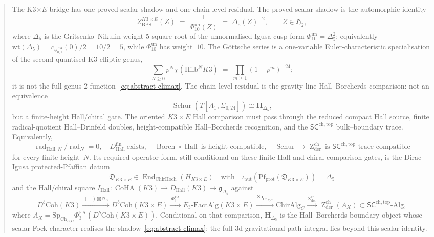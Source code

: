 \documentclass[11pt]{memoir}
\providecommand{\PhiFA}{\Phi^{\mathrm{FA}}}
\providecommand{\SpCh}{\mathrm{Sp}_{\mathrm{Ch}}}
\providecommand{\CoHA}{\operatorname{CoHA}}
\newcommand{\SCchtop}{{\mathsf{SC}^{\mathrm{ch,top}}}}
\providecommand{\Zderch}{\operatorname{Z}^{\mathrm{ch}}_{\mathrm{der}}}
\providecommand{\PhiFA}{\Phi^{\mathrm{FA}}}
\providecommand{\SpCh}{\mathrm{Sp}^{\mathrm{ch}}}
\providecommand{\protectedPfaff}[1]{\mathrm{Pf}_{\mathrm{prot}}(#1)}
\begin{document}
\begin{abstract}
The K3$\times E$ bridge has one proved scalar shadow and one
chain-level residual. The proved scalar shadow is the automorphic
identity
\begin{equation}
 Z^{K3\times E}_{\mathrm{BPS}}(Z)
 \;=\;
 \frac{1}{\Phi_{10}^{\mathrm{un}}(Z)}
 \;=\;
 \Delta_5(Z)^{-2},
 \qquad Z\in\mathfrak H_2,
\label{eq:abstract-climax}
\end{equation}
where $\Delta_5$ is the Gritsenko--Nikulin weight-$5$ square root
of the unnormalised Igusa cusp form
$\Phi_{10}^{\mathrm{un}}=\Delta_5^2$; equivalently
$\mathrm{wt}(\Delta_5)=c_{\phi_{0,1}^{K3}}(0)/2=10/2=5$, while
$\Phi_{10}^{\mathrm{un}}$ has weight~$10$. The G\"ottsche series is a one-variable
Euler-characteristic specialisation of the second-quantised K3
elliptic genus,
\[
 \sum_{N\ge 0}p^N\chi(\mathrm{Hilb}^N K3)
 \;=\;
 \prod_{m\ge 1}(1-p^m)^{-24};
\]
it is not the full genus-$2$ function~\eqref{eq:abstract-climax}.
The chain-level residual is the gravity-line Hall--Borcherds
comparison: not an equivalence
\[
\operatorname{Schur}\!\left(T[A_1,\Sigma_{0,24}]\right)
\cong \mathbf H_{\Delta_5},
\]
but a finite-height Hall/chiral gate.  The oriented $K3\times E$
Hall comparison must pass through the reduced compact Hall source,
finite radical-quotient Hall--Drinfeld doubles, height-compatible
Hall--Borcherds recognition, and the $\SCchtop$ bulk--boundary trace.
Equivalently,
\[
\operatorname{rad}_{\mathrm{Hall},N}/\operatorname{rad}_{N}=0,\quad
D^{\mathrm{fin}}_{\mathrm{Hall}}\ \text{exists},\quad
\operatorname{Borch}\circ\operatorname{Hall}\ \text{is height-compatible},
\quad
\operatorname{Schur}\to\Zderch\ \text{is }\SCchtop\text{-trace compatible}
\]
for every finite height~$N$. Its required operator form, still
conditional on these finite Hall and chiral-comparison gates, is the
Dirac--Igusa protected-Pfaffian datum
\[
 \mathfrak D_{K3\times E}\in
 \operatorname{End}_{\mathrm{ChirHoch}}\!\left(H_{K3\times E}\right)
 \quad\text{with}\quad
 \iota_{\mathrm{aut}}\!\left(\protectedPfaff{\mathfrak D_{K3\times E}}\right)
 =\Delta_5
\]
and the Hall/chiral square
\(I_{\mathrm{Hall}}\colon
\CoHA(K3)\to D_{\mathrm{Hall}}(K3)\to\mathfrak g_{\Delta_5}\)
against
\[
D^{b}\mathrm{Coh}(K3)
\xrightarrow{\ (-)\boxtimes\mathcal O_E\ }
D^{b}\mathrm{Coh}(K3\times E)
\xrightarrow{\ \PhiFA_{3}\ }
E_3\text{-}\mathrm{FactAlg}(K3\times E)
\xrightarrow{\ \SpCh_{E,C}\ }
\mathrm{ChirAlg}_C
\xrightarrow{\ \Zderch\ }
\Zderch(A_X)\subset\SCchtop\text{-}\mathrm{Alg},
\]
where \(A_X=\SpCh_{E,C}\PhiFA_3(D^b\mathrm{Coh}(K3\times E))\).
Conditional on that comparison, $\mathbf H_{\Delta_5}$ is the
Hall--Borcherds boundary object whose scalar Fock character realises the
shadow~\eqref{eq:abstract-climax}; the full $3$d gravitational
path integral lies beyond this scalar identity.


\end{abstract}
\end{document}
